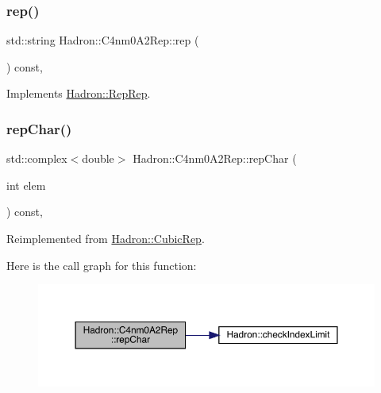 \subsubsection{\texorpdfstring{rep()}{rep()}\hspace{0.1cm}{\footnotesize\ttfamily [5/5]}}
{\footnotesize\ttfamily std\+::string Hadron\+::\+C4nm0\+A2\+Rep\+::rep (\begin{DoxyParamCaption}{ }\end{DoxyParamCaption}) const\hspace{0.3cm}{\ttfamily [inline]}, {\ttfamily [virtual]}}



Implements \mbox{\hyperlink{structHadron_1_1RepRep_ab3213025f6de249f7095892109575fde}{Hadron\+::\+Rep\+Rep}}.

\mbox{\label{structHadron_1_1C4nm0A2Rep_ad4d1ed2c8ee991654f7c1369f487a810}} 
\subsubsection{\texorpdfstring{repChar()}{repChar()}\hspace{0.1cm}{\footnotesize\ttfamily [1/3]}}
{\footnotesize\ttfamily std\+::complex$<$double$>$ Hadron\+::\+C4nm0\+A2\+Rep\+::rep\+Char (\begin{DoxyParamCaption}\item[{int}]{elem }\end{DoxyParamCaption}) const\hspace{0.3cm}{\ttfamily [inline]}, {\ttfamily [virtual]}}



Reimplemented from \mbox{\hyperlink{structHadron_1_1CubicRep_af45227106e8e715e84b0af69cd3b36f8}{Hadron\+::\+Cubic\+Rep}}.

Here is the call graph for this function\+:
\nopagebreak
\begin{figure}[H]
\begin{center}
\leavevmode
\includegraphics[width=350pt]{d2/db9/structHadron_1_1C4nm0A2Rep_ad4d1ed2c8ee991654f7c1369f487a810_cgraph}
\end{center}
\end{figure}
\mbox{\label{structHadron_1_1C4nm0A2Rep_ad4d1ed2c8ee991654f7c1369f487a810}} 
